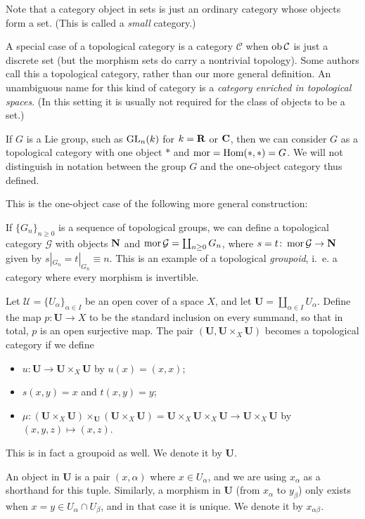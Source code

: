 \documentclass[a4paper,openany]{scrbook}
\renewcommand{\C}{\mathcal C}
\begin{document}
Note that a category object in sets is just an ordinary category whose objects form a set. (This is called a \emph{small} category.)

A special case of a topological category is a category $\C$ when $\ob\C$ is just a discrete set (but the morphism sets do carry a nontrivial topology). Some authors call this a topological category, rather than our more general definition. An unambiguous name for this kind of category is a \emph{category enriched in topological spaces}. (In this setting it is usually not required for the class of objects to be a set.)

\begin{example}
If $G$ is a Lie group, such as $\operatorname{GL}_n(k)$ for $k=\mathbf R$ or $\mathbf C$, then we can consider $G$ as a topological category with one object $*$ and $\operatorname{mor} = \operatorname{Hom}(*,*) = G$. We will not distinguish in notation between the group $G$ and the one-object category thus defined.
\end{example}

This is the one-object case of the following more general construction:

\begin{example}
If $\{G_n\}_{n \geq 0}$ is a sequence of topological groups, we can define a topological category $\mathcal G$ with objects $\mathbf{N}$ and $\operatorname{mor} \mathcal G = \coprod_{n \geq 0} G_n$, where $s=t\colon \operatorname{mor} \mathcal G \to \mathbf{N}$ given by $s|_{G_n} = t|_{G_n} \equiv n$. This is an example of a topological \emph{groupoid}, i.~e. a category where every morphism is invertible. 
\end{example}

\begin{example} \label{exa:covergroupoid}
Let $\mathcal U = \{U_\alpha\}_{\alpha \in I}$ be an open cover of a space $X$, and let $\mathbf U = \coprod_{\alpha \in I} U_\alpha$. Define the map $p\colon \mathbf U \to X$ to be the standard inclusion on every summand, so that in total, $p$ is an open surjective map.
The pair $(\mathbf U,\mathbf U \times_X \mathbf U)$ becomes a topological category if we define
\begin{itemize}
\item $u\colon \mathbf U \to \mathbf U \times_X \mathbf U$ by $u(x) = (x,x)$;
\item $s(x,y) = x$ and $t(x,y) = y$;
\item $\mu\colon (\mathbf U \times_X \mathbf U) \times_{\mathbf U} (\mathbf U \times_X \mathbf U) = \mathbf U \times_X \mathbf U \times_X \mathbf U \to \mathbf U \times_X \mathbf U$ by $(x,y,z) \mapsto (x,z)$.
\end{itemize}
This is in fact a groupoid as well. We denote it by $\mathbf U$.

An object in $\mathbf U$ is a pair $(x,\alpha)$ where $x \in U_\alpha$, and we are using $x_\alpha$ as a shorthand for this tuple. Similarly, a morphism in $\mathbf U$ (from $x_\alpha$ to $y_\beta$) only exists when $x=y \in U_\alpha \cap U_\beta$, and in that case it is unique. We denote it by $x_{\alpha\beta}$.
\end{example}
\end{document}
